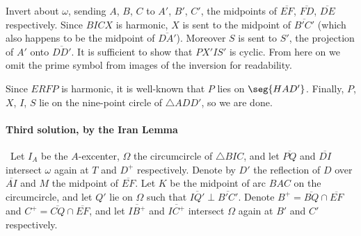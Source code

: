 Invert about $\omega$, sending $A$, $B$, $C$ to $A'$, $B'$, $C'$, the midpoints of $\overline{EF}$, $\overline{FD}$, $\overline{DE}$ respectively. Since $BICX$ is harmonic, $X$ is sent to the midpoint of $\overline{B'C'}$ (which also happens to be the midpoint of $\overline{DA'}$). Moreover $S$ is sent to $S'$, the projection of $A'$ onto $\overline{DD'}$. It is sufficient to show that $PX'IS'$ is cyclic. From here on we omit the prime symbol from images of the inversion for readability.

Since $ERFP$ is harmonic, it is well-known that $P$ lies on $\seg{HAD'}$. Finally, $P$, $X$, $I$, $S$ lie on the nine-point circle of $\triangle ADD'$, so we are done.

\paragraph{Third solution, by the Iran Lemma}\     Let $I_A$ be the $A$-excenter, $\Omega$ the circumcircle of $\triangle BIC$, and let $\overline{PQ}$ and $\overline{DI}$ intersect $\omega$ again at $T$ and $D^+$ respectively. Denote by $D'$ the reflection of $D$ over $\overline{AI}$ and $M$ the midpoint of $\overline{EF}$. Let $K$ be the midpoint of arc $BAC$ on the circumcircle, and let $Q'$ lie on $\Omega$ such that $\overline{IQ'}\perp\overline{B'C'}$. Denote $B^+=\overline{BQ}\cap\overline{EF}$ and $C^+=\overline{CQ}\cap\overline{EF}$, and let $\overline{IB^+}$ and $\overline{IC^+}$ intersect $\Omega$ again at $B'$ and $C'$ respectively.
